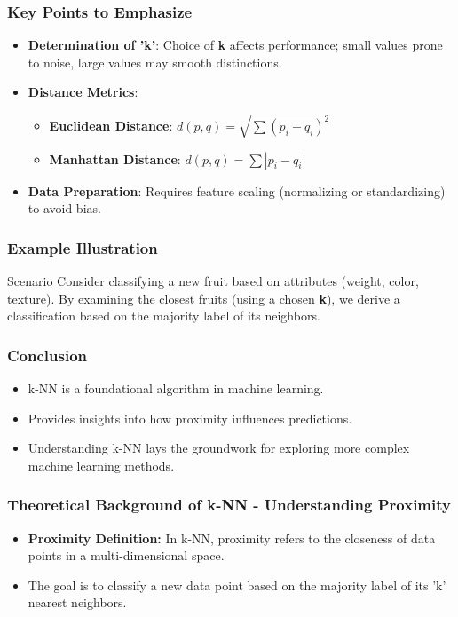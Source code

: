 \documentclass[aspectratio=169]{beamer}
\begin{document}
\begin{frame}[fragile]
    \frametitle{Key Points to Emphasize}
    \begin{itemize}
        \item \textbf{Determination of 'k'}: Choice of \textbf{k} affects performance; small values prone to noise, large values may smooth distinctions.
        \item \textbf{Distance Metrics}:
        \begin{itemize}
            \item \textbf{Euclidean Distance}: \( d(p, q) = \sqrt{\sum (p_i - q_i)^2} \)
            \item \textbf{Manhattan Distance}: \( d(p, q) = \sum |p_i - q_i| \)
        \end{itemize}
        \item \textbf{Data Preparation}: Requires feature scaling (normalizing or standardizing) to avoid bias.
    \end{itemize}
\end{frame}

\begin{frame}[fragile]
    \frametitle{Example Illustration}
    \begin{block}{Scenario}
        Consider classifying a new fruit based on attributes (weight, color, texture). By examining the closest fruits (using a chosen \textbf{k}), we derive a classification based on the majority label of its neighbors.
    \end{block}
\end{frame}

\begin{frame}[fragile]
    \frametitle{Conclusion}
    \begin{itemize}
        \item k-NN is a foundational algorithm in machine learning.
        \item Provides insights into how proximity influences predictions.
        \item Understanding k-NN lays the groundwork for exploring more complex machine learning methods.
    \end{itemize}
\end{frame}

\begin{frame}[fragile]
    \frametitle{Theoretical Background of k-NN - Understanding Proximity}
    \begin{itemize}
        \item \textbf{Proximity Definition:} In k-NN, proximity refers to the closeness of data points in a multi-dimensional space.
        \item The goal is to classify a new data point based on the majority label of its 'k' nearest neighbors.
    \end{itemize}
\end{frame}
\end{document}
